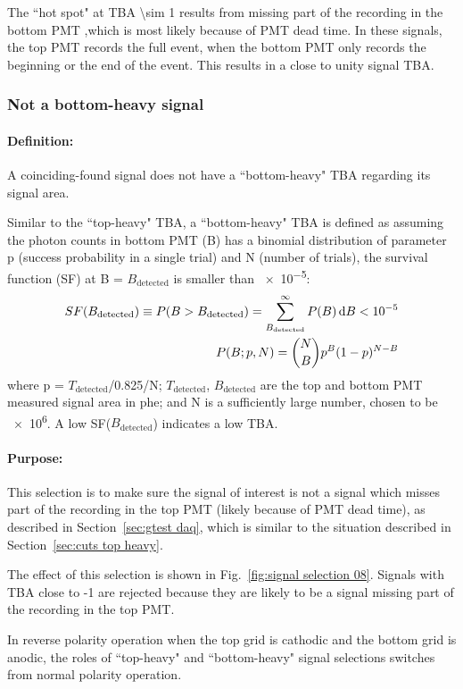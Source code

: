 The ``hot spot" at TBA \num{\sim 1} results from missing part of the recording in the bottom PMT ,which is most likely because of PMT dead time. In these signals, the top PMT records the full event, when the bottom PMT only records the beginning or the end of the event. This results in a close to unity signal TBA.

\subsubsection{Not a bottom-heavy signal}
\paragraph{Definition:}
A coinciding-found signal does not have a ``bottom-heavy" TBA regarding its signal area. 

Similar to the ``top-heavy" TBA, a ``bottom-heavy" TBA is defined as assuming the photon counts in bottom PMT (B) has a binomial distribution of parameter p (success probability in a single trial) and N (number of trials), the survival function (SF) at B = $B_{\text{detected}}$ is smaller than \num{e-5}:
\begin{align}
SF (B_{\text{detected}}) \equiv P(B > B_{\text{detected}}) = \sum_{B_{\text{detected}}}^{\infty} P (B) \operatorname{d}\!{B}< \num{e-5} \\
P (B; p, N) = \binom{N}{B} p^{B} (1-p)^{N-B}
\end{align}    
where p = $T_{\text{detected}}$/\num{0.825}/N; $T_{\text{detected}}$, $B_{\text{detected}}$ are the top and bottom PMT measured signal area in \si{phe}; and N is a sufficiently large number, chosen to be \num{e6}. A low SF($B_{\text{detected}}$) indicates a low TBA. 
\paragraph{Purpose:}
This selection is to make sure the signal of interest is not a signal which misses part of the recording in the top PMT (likely because of PMT dead time), as described in Section~\ref{sec:gtest daq}, which is similar to the situation described in Section~\ref{sec:cuts top heavy}.

The effect of this selection is shown in Fig.~\ref{fig:signal selection 08}. Signals with TBA close to -1 are rejected because they are likely to be a signal missing part of the recording in the top PMT.

In reverse polarity operation when the top grid is cathodic and the bottom grid is anodic, the roles of ``top-heavy" and ``bottom-heavy" signal selections switches from normal polarity operation.

